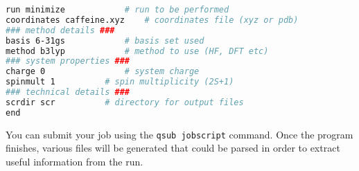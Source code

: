 \documentclass[a4paper,12pt]{assignment}
\begin{document}
\begin{lstlisting}[language=bash,caption={Example \texttt{terachem} input file},frame=trBL]
run minimize			# run to be performed 
coordinates caffeine.xyz	# coordinates file (xyz or pdb)
### method details ###
basis 6-31gs			# basis set used 
method b3lyp			# method to use (HF, DFT etc) 
### system properties ###
charge 0				# system charge
spinmult 1			# spin multiplicity (2S+1)
### technical details ###
scrdir scr			# directory for output files
end
\end{lstlisting}

You can submit your job using the \texttt{qsub jobscript} command. Once the program finishes, various files will be generated that could be parsed in order to extract useful information from the run. 
\end{document}

